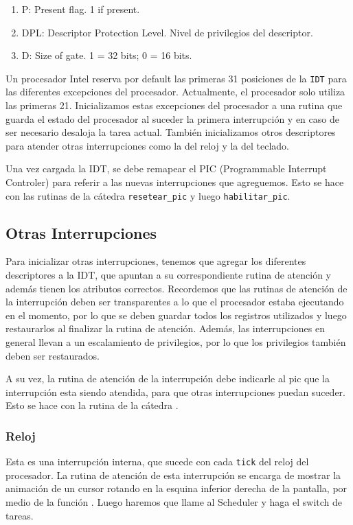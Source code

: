 \begin{enumerate}
\item P: Present flag. 1 if present.
\item DPL: Descriptor Protection Level. Nivel de privilegios del descriptor.
\item D: Size of gate. 1 = 32 bits; 0 = 16 bits.
\end{enumerate}

Un procesador Intel reserva por default las primeras 31 posiciones de la \texttt{IDT} para las diferentes excepciones del procesador. Actualmente, el procesador solo utiliza las primeras 21. Inicializamos estas excepciones del procesador a una rutina que guarda el estado del procesador al suceder la primera interrupción y en caso de ser necesario desaloja la tarea actual. También inicializamos otros descriptores para atender otras interrupciones como la del reloj y la del teclado.

Una vez cargada la IDT, se debe remapear el PIC (Programmable Interrupt Controler) para referir a las nuevas interrupciones que agreguemos. Esto se hace con las rutinas de la cátedra \texttt{resetear\_pic} y luego \texttt{habilitar\_pic}.

\subsection{Otras Interrupciones}

Para inicializar otras interrupciones, tenemos que agregar los diferentes descriptores a la IDT, que apuntan a su correspondiente rutina de atención y además tienen los atributos correctos. Recordemos que las rutinas de atención de la interrupción deben ser transparentes a lo que el procesador estaba ejecutando en el momento, por lo que se deben guardar todos los registros utilizados y luego restaurarlos al finalizar la rutina de atención. Además, las interrupciones en general llevan a un escalamiento de privilegios, por lo que los privilegios también deben ser restaurados.

A su vez, la rutina de atención de la interrupción debe indicarle al pic que la interrupción esta siendo atendida, para que otras interrupciones puedan suceder. Esto se hace con la rutina de la cátedra .

\subsubsection{Reloj}

Esta es una interrupción interna, que sucede con cada \texttt{tick} del reloj del procesador. La rutina de atención de esta interrupción se encarga de mostrar la animación de un cursor rotando en la esquina inferior derecha de la pantalla, por medio de la función . Luego haremos que llame al Scheduler y haga el switch de tareas.

